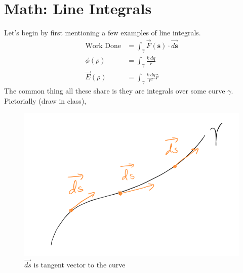 \documentclass{article}
\begin{document}
\section{Math: Line Integrals}
Let's begin by first mentioning a few examples of line integrals. 
\begin{align}
    \text{Work Done} &= \int_\gamma \vec{F}(\mathbf{s}) \cdot \overrightarrow{d\mathbf{s}} \\
    \phi(\rho) &= \int_\gamma \frac{k\ dq}{r} \\
    \vec{E}(\rho) &= \int_\gamma \frac{k \ dq}{r^2} \hat{r}
\end{align}
The common thing all these share is they are integrals over some curve $\gamma$. Pictorially (draw in class), 
\begin{figure}[h]
    \centering
    \includegraphics[width=0.5\linewidth]{images/lineintegral.png}
    \caption{$\overrightarrow{ds}$ is tangent vector to the curve}
    \label{fig:lineintegral}
\end{figure}\\
\end{document}
